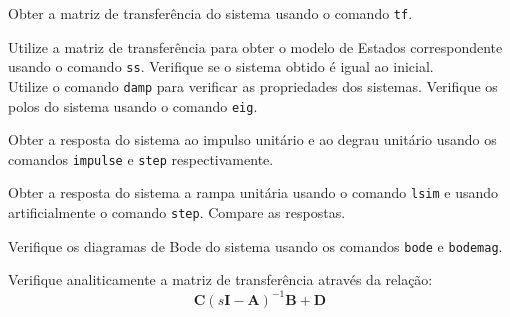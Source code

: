 \documentclass{article}
\begin{document}
\newpage\begin{exercise}\label{ex3}
    Obter a matriz de transferência do sistema usando o comando \texttt{tf}.
\end{exercise}
\begin{resolution}

\end{resolution}

\newpage\begin{exercise}\label{ex4}
    Utilize a matriz de transferência para obter o modelo de Estados correspondente usando o comando \texttt{ss}. Verifique se o sistema obtido é igual ao inicial.\\

    Utilize o comando \texttt{damp} para verificar as propriedades dos sistemas. Verifique os polos do sistema usando o comando \texttt{eig}.
\end{exercise}
\begin{resolution}

\end{resolution}

\newpage\begin{exercise}\label{ex5}
    Obter a resposta do sistema ao impulso unitário e ao degrau unitário usando os comandos \texttt{impulse} e \texttt{step} respectivamente.
\end{exercise}
\begin{resolution}

\end{resolution}

\newpage\begin{exercise}\label{ex6}
    Obter a resposta do sistema a rampa unitária usando o comando \texttt{lsim} e usando artificialmente o comando \texttt{step}. Compare as respostas.
\end{exercise}
\begin{resolution}

\end{resolution}

\newpage\begin{exercise}\label{ex7}
    Verifique os diagramas de Bode do sistema usando os comandos \texttt{bode} e \texttt{bodemag}.
\end{exercise}
\begin{resolution}

\end{resolution}

\newpage\begin{exercise}\label{ex8}
    Verifique analiticamente a matriz de transferência através da relação:
    \begin{equation}
        \boxed{\mathbf{C}(s\mathbf{I} - \mathbf{A})^{-1} \mathbf{B} + \mathbf{D}}
    \end{equation}
\end{exercise}
\begin{resolution}

\end{resolution}
\end{document}
